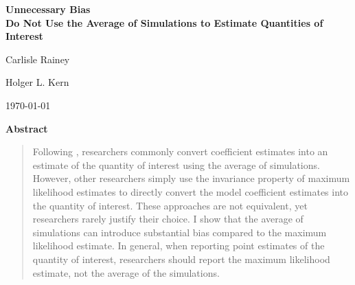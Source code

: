 \documentclass[11pt]{article}
\begin{document}
\begin{center}

{\LARGE \textbf{Unnecessary Bias}}\\\vspace{2mm}
{ \textbf{Do Not Use the Average of Simulations to Estimate Quantities of Interest}}

\vspace{5mm}

Carlisle Rainey

\vspace{5mm}

Holger L. Kern

\vspace{1cm}

\today
\end{center}

\vspace{5mm}

{\centerline{\textbf{Abstract}}}
\begin{quote}\noindent
Following \cite{KingTomzWittenberg2000}, researchers commonly convert coefficient estimates into an estimate of the quantity of interest using the average of simulations.
However, other researchers simply use the invariance property of maximum likelihood estimates to directly convert the model coefficient estimates into the quantity of interest.
These approaches are not equivalent, yet researchers rarely justify their choice.
I show that the average of simulations can introduce substantial bias compared to the maximum likelihood estimate.
In general, when reporting point estimates of the quantity of interest, researchers should report the maximum likelihood estimate, not the average of the simulations.
 \end{quote}


\end{document}
